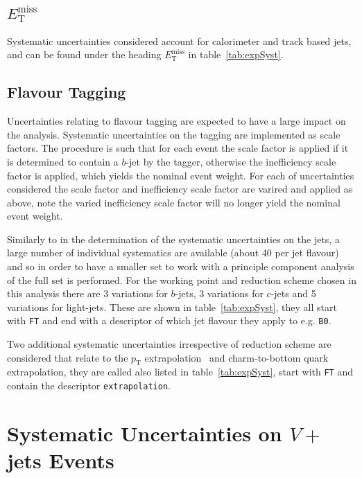 \subsection{$E_{\mathrm{T}}^{\text{miss}}$}

Systematic uncertainties considered account for calorimeter and track based
jets, and can be found under the heading $E_{\mathrm{T}}^{\text{miss}}$ in
table~\ref{tab:expSyst}.

\subsection{Flavour Tagging}

Uncertainties relating to flavour tagging are expected to have a large impact on
the analysis. Systematic uncertainties on the tagging are implemented as scale
factors. The procedure is such that for each event the scale factor is applied
if it is determined to contain a $b$-jet by the tagger, otherwise the
inefficiency scale factor is applied, which yields the nominal event weight. For
each of uncertainties considered the scale factor and inefficiency scale factor
are varired and applied as above, note the varied inefficiency scale factor will
no longer yield the nominal event weight.

Similarly to in the determination of the systematic uncertainties on the jets, a
large number of individual systematics are available (about 40 per jet flavour)
and so in order to have a smaller set to work with a principle component
analysis of the full set is performed. For the working point and reduction
scheme chosen in this analysis there are 3 variations for $b$-jets, 3 variations
for $c$-jets and 5 variations for light-jets. These are shown in
table~\ref{tab:expSyst}, they all start with \texttt{FT} and end with a
descriptor of which jet flavour they apply to e.g. \texttt{B0}.

Two additional systematic uncertainties irrespective of reduction scheme are
considered that relate to the $p_{\mathrm{T}}$ extrapolation~\cite{BTaggingExtrap2015} and
charm-to-bottom quark extrapolation, they are called also listed in
table~\ref{tab:expSyst}, start with \texttt{FT} and contain the descriptor
\texttt{extrapolation}.

\section{Systematic Uncertainties on $V+$jets Events}
\label{sec:vjets}


